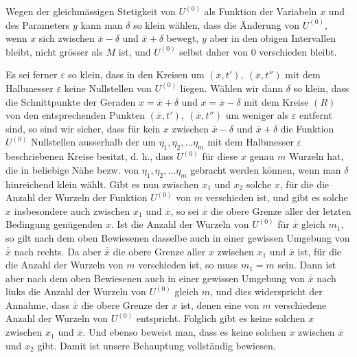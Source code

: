 Wegen der gleichmässigen Stetigkeit von \(U^{(0)}\) als Funktion der Variabeln \(x\)
und des Parameters \(y\) kann man \(\delta\) so klein wählen, dass die Änderung von
\(U^{(0)}\), wenn \(x\) sich zwischen \(\overline x-\delta\) und \(\overline x+\delta\) bewegt, \(y\) aber in den obigen Intervallen
bleibt, nicht grösser als \(M\) ist, und \(U^{(0)}\) selbst daher von 0 verschieden
bleibt.
\par
Es sei ferner \(\varepsilon\) so klein, dass in den Kreisen um \((\overline x,t'),\ (\overline x,t'')\) mit dem
Halbmesser \(\varepsilon\) keine Nullstellen von \(U^{(0)}\) liegen. Wählen wir dann \(\delta\) so klein,
dass die Schnittpunkte der Geraden \(x=\overline x+\delta\) und \(x=\overline x-\delta\) mit dem Kreise
\((R)\) von den entsprechenden Punkten \((\overline x,t'),\ (\overline x,t'')\) um weniger als \(\varepsilon\) entfernt
sind, so sind wir sicher, dass für kein \(x\) zwischen \(\overline x-\delta\) und \(\overline x+\delta\) die Funktion
\(U^{(0)}\) Nullstellen ausserhalb der um \(\eta_1,\eta_2,\ldots\eta_m\) mit dem Halbmesser \(\varepsilon\)
beschriebenen Kreise besitzt, d. h., dass \(U^{(0)}\) für diese \(x\) genau \(m\) Wurzeln hat,
die in beliebige Nähe bezw. von \(\eta_1,\eta_2,\ldots\eta_m\) gebracht werden können, wenn
man \(\delta\) hinreichend klein wählt. Gibt es nun zwischen \(x_1\) und \(x_2\) solche \(x\),
für die die Anzahl der Wurzeln der Funktion \(U^{(0)}\) von \(m\) verschieden ist, und
gibt es solche \(x\) insbesondere auch zwischen \(x_1\) und \(\overline x\), so sei \(\overline{\overline x}\) die obere
Grenze aller der letzten Bedingung genügenden \(x\). Ist die Anzahl der Wurzeln
von \(U^{(0)}\) für \(\overline{\overline x}\) gleich \(m_1\), so gilt nach dem oben Bewiesenen dasselbe auch in
einer gewissen Umgebung von \(\overline{\overline x}\) nach rechts. Da aber \(\overline{\overline x}\) die obere Grenze
aller \(x\) zwischen \(x_1\) und \(\overline x\) ist, für die die Anzahl der Wurzeln von \(m\) verschieden
ist, so muss \(m_1=m\) sein. Dann ist aber nach dem oben Bewiesenen
auch in einer gewissen Umgebung von \(\overline{\overline x}\) nach links die Anzahl der Wurzeln
von \(U^{(0)}\) gleich \(m\), und dies widerspricht der Annahme, dass \(\overline{\overline x}\) die obere Grenze
der \(x\) ist, denen eine von \(m\) verschiedene Anzahl der Wurzeln von \(U^{(0)}\) entspricht.
Folglich gibt es keine solchen \(x\) zwischen \(x_1\) und \(\overline x\). Und ebenso
beweist man, dass es keine solchen \(x\) zwischen \(\overline x\) und \(x_2\) gibt. Damit ist
unsere Behauptung vollständig bewiesen.
\par
